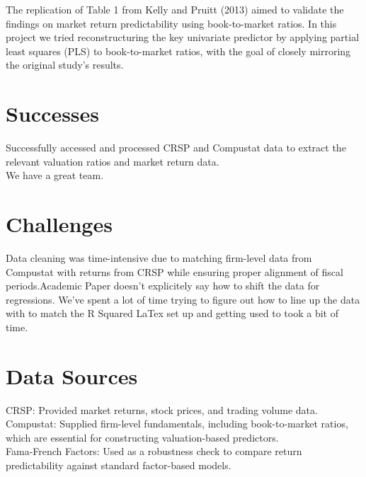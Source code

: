 \documentclass[12pt]{article}
\begin{document}
The replication of Table 1 from Kelly and Pruitt (2013) aimed to validate the 
findings on market return predictability using book-to-market ratios. In this project we 
tried reconstructuring the key univariate predictor by applying partial least squares (PLS) 
to book-to-market ratios, with the goal of closely mirroring the original study’s results.

\doublespacing
\section{Successes}
Successfully accessed and processed CRSP and Compustat data to extract the relevant valuation 
ratios and market return data.
\\We have a great team. 


\doublespacing
\section{Challenges}

Data cleaning was time-intensive due to matching firm-level data from Compustat with 
returns from CRSP while ensuring proper alignment of fiscal periods.Academic Paper doesn't 
explicitely say how to shift the data for regressions. 
We've spent a lot of time trying to figure out how to line up the data with to match the R Squared
LaTex set up and getting used to took a bit of time. 

\doublespacing
\section{Data Sources}

CRSP: Provided market returns, stock prices, and trading volume data.
\\Compustat: Supplied firm-level fundamentals, including book-to-market ratios, 
which are essential for constructing valuation-based predictors.
\\Fama-French Factors: Used as a robustness check to compare return predictability against standard factor-based models.\par
\end{document}
